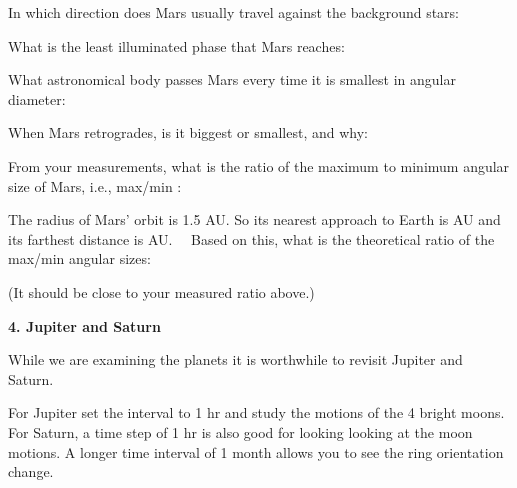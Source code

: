 \medskip\noindent 
In which direction does Mars usually travel against the background stars: \makebox[4cm]{\hrulefill}

\medskip\noindent
What is the least illuminated phase that Mars reaches: \makebox[4cm]{\hrulefill}

\medskip\noindent
What astronomical body passes Mars every time it is smallest in
angular diameter:
\makebox[4cm]{\hrulefill}

\medskip\noindent
When Mars retrogrades, is it biggest or smallest, and why: \makebox[4cm]{\hrulefill}



\medskip\noindent
From your measurements, what is the ratio of the maximum to minimum
angular size of Mars, i.e., max/min :\makebox[4cm]{\hrulefill}

\medskip\noindent
The radius of Mars' orbit is 1.5 AU. So its nearest approach to Earth is
\makebox[
1cm]{\hrulefill} AU and its farthest distance is
\makebox[1cm]{\hrulefill} AU. \ \
Based on this, what is the theoretical ratio of the max/min angular
sizes:\makebox[1cm]{\hrulefill}

\noindent
(It should be close to your measured ratio above.)


\bigskip
\noindent
{\bf 4. Jupiter and Saturn}

\medskip
While we are examining the planets it is worthwhile to revisit Jupiter
and Saturn.

\medskip
For Jupiter set the interval to 1 hr and study the motions of the 4
bright moons. For Saturn, a time step of 1 hr is also good for looking
looking at the moon motions. A longer time interval of 1 month allows
you to see the ring orientation change.







